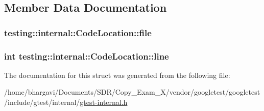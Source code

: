 \subsection{Member Data Documentation}
\subsubsection[{\texorpdfstring{file}{file}}]{ testing\+::internal\+::\+Code\+Location\+::file}\hypertarget{structtesting_1_1internal_1_1_code_location_ab8a24d5e63295e411d37578dbb9427c0}{}\label{structtesting_1_1internal_1_1_code_location_ab8a24d5e63295e411d37578dbb9427c0}
\subsubsection[{\texorpdfstring{line}{line}}]{\setlength{\rightskip}{0pt plus 5cm}int testing\+::internal\+::\+Code\+Location\+::line}\hypertarget{structtesting_1_1internal_1_1_code_location_a01c977c7e8834a05a6d6c40b0c416045}{}\label{structtesting_1_1internal_1_1_code_location_a01c977c7e8834a05a6d6c40b0c416045}


The documentation for this struct was generated from the following file\+:\begin{DoxyCompactItemize}
\item 
/home/bhargavi/\+Documents/\+S\+D\+R/\+Copy\+\_\+\+Exam\+\_\+X/vendor/googletest/googletest/include/gtest/internal/\hyperlink{gtest-internal_8h}{gtest-\/internal.\+h}\end{DoxyCompactItemize}
